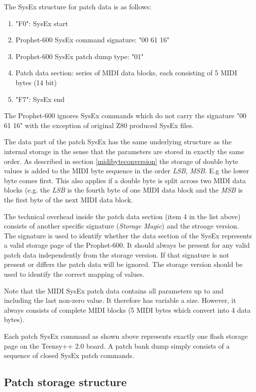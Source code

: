 The SysEx structure for patch data is as follows:

\begin{enumerate}
  \item "F0": SysEx start
  \item Prophet-600 SysEx command signature: "00 61 16"
  \item Prophet-600 SysEx patch dump type: "01"
  \item Patch data section: series of MIDI data blocks, each consisting of 5 MIDI bytes (14 bit) 
  \item "F7": SysEx end
\end{enumerate}

The Prophet-600 ignores SysEx commands which do not carry the signature "00 61 16" with the exception of original Z80 produced SysEx files.

The data part of the patch SysEx has the same underlying structure as the internal storage in the sense that the parameters are stored in exactly the same order. As described in section \ref{midibyteconversion} the storage of double  byte values is added to the MIDI byte sequence in the order \textit{LSB}, \textit{MSB}. E.g the lower byte comes first. This also applies if a double byte is split across two MIDI data blocks (e.g. the \textit{LSB} is the fourth byte of one MIDI data block and the \textit{MSB} is the first byte of the next MIDI data block. 

The technical overhead inside the patch data section (item 4 in the list above) consists of another specific signature (\textit{Storage Magic}) and the stroage version. The signature is used to identify whether the data section of the SysEx represents a valid storage page of the Prophet-600. It should  always be present for any valid patch data independently from the storage version. If that signature is not present or differs the patch data will be ignored. The storage version should be used to identify the correct mapping of values.  

Note that the MIDI SysEx patch data contains all parameters up to and including the last non-zero value. It therefore has variable a size. However, it always consists of complete MIDI blocks (5 MIDI bytes which convert into 4 data bytes).

Each patch SysEx command as shown above represents exactly one flash storage page on the Teensy++ 2.0 board. A patch bank dump simply consists of a sequence of closed SysEx patch commands.

\subsection{Patch storage structure}\label{patchstore}

